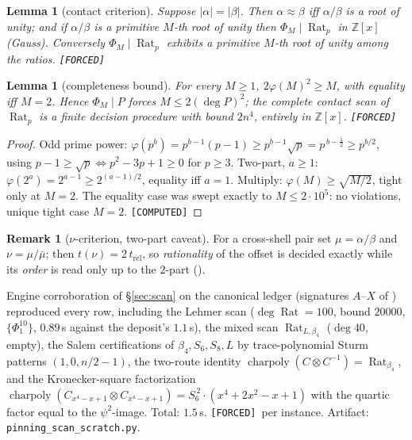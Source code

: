 \documentclass[11pt]{article}
\newcommand{\F}{\textnormal{\texttt{[FORCED]}}}
\newcommand{\C}{\textnormal{\texttt{[COMPUTED]}}}
\newcommand{\Z}{\mathbb{Z}}
\newcommand{\Rat}{\operatorname{Rat}}
\newtheorem{lemma}[theorem]{Lemma}
\theoremstyle{definition}
\newtheorem{remark}[theorem]{Remark}
\begin{document}
\begin{lemma}[contact criterion]\label{lem:contact}
Suppose $|\alpha|=|\beta|$. Then $\alpha\approx\beta$ iff $\alpha/\beta$ is a
root of unity; and if $\alpha/\beta$ is a primitive $M$-th root of unity then
$\Phi_M\mid\Rat_p$ in $\Z[x]$ (Gauss). Conversely $\Phi_M\mid\Rat_p$ exhibits a
primitive $M$-th root of unity among the ratios. \F
\end{lemma}

\begin{lemma}[completeness bound]\label{lem:totient}
For every $M\ge1$, $2\varphi(M)^2\ge M$, with equality iff $M=2$. Hence
$\Phi_M\mid P$ forces $M\le 2(\deg P)^2$; the complete contact scan of $\Rat_p$
is a finite decision procedure with bound $2n^4$, entirely in $\Z[x]$. \F
\end{lemma}

\begin{proof}
Odd prime power: $\varphi(p^b)=p^{b-1}(p-1)\ge p^{b-1}\sqrt{p}=p^{\,b-\frac12}\ge p^{b/2}$,
using $p-1\ge\sqrt p\iff p^2-3p+1\ge0$ for $p\ge3$. Two-part, $a\ge1$:
$\varphi(2^a)=2^{a-1}\ge 2^{(a-1)/2}$, equality iff $a=1$. Multiply:
$\varphi(M)\ge\sqrt{M/2}$, tight only at $M=2$. The equality case was swept
exactly to $M\le 2\cdot10^{5}$: no violations, unique tight case $M=2$. \C
\end{proof}

\begin{remark}[$\nu$-criterion, two-part caveat]\label{rem:nu2part}
For a cross-shell pair set $\mu=\alpha/\beta$ and $\nu=\mu/\bar\mu$; then
$t(\nu)=2\,t_{\mathrm{rel}}$, so \emph{rationality} of the offset is decided
exactly while its \emph{order} is read only up to the $2$-part
(\cite[Rem.~7.6]{relcharge}).
\end{remark}

Engine corroboration of \S\ref{sec:scan} on the canonical ledger (signatures
$A$--$X$ of \cite{relcharge}) reproduced every row, including the Lehmer scan
($\deg\Rat=100$, bound $20000$, $\{\Phi_1^{10}\}$, $0.89$\,s against the
deposit's $1.1$\,s), the mixed scan $\Rat_{L,\beta_4}$ ($\deg 40$, empty), the
Salem certifications of $\beta_4,S_6,S_8,L$ by trace-polynomial Sturm patterns
$(1,0,n/2-1)$, the two-route identity
$\operatorname{charpoly}(C\otimes C^{-1})=\Rat_{\beta_4}$, and the
Kronecker-square factorization
$\operatorname{charpoly}(C_{x^4-x+1}\otimes C_{x^4-x+1})=S_6^{\,2}\cdot(x^4+2x^2-x+1)$
with the quartic factor equal to the $\psi^2$-image. Total: $1.5$\,s. \F\ per
instance. Artifact: \texttt{pinning\_scan\_scratch.py}.
\end{document}

